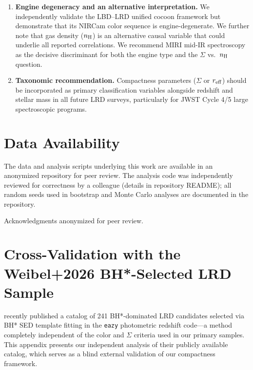 \documentclass[twocolumn,linenumbers]{aastex631}
\begin{document}
\begin{enumerate}
\item \textbf{Engine degeneracy and an alternative interpretation.} We independently validate the LBD--LRD unified cocoon framework \citep{Sneppen2026a} but demonstrate that its NIRCam color sequence is engine-degenerate. We further note that gas density ($n_{\rm H}$) is an alternative causal variable that could underlie all reported correlations. We recommend MIRI mid-IR spectroscopy as the decisive discriminant for both the engine type and the $\Sigma$ vs.\ $n_{\rm H}$ question.

\item \textbf{Taxonomic recommendation.} Compactness parameters ($\Sigma$ or $r_{\rm eff}$) should be incorporated as primary classification variables alongside redshift and stellar mass in all future LRD surveys, particularly for JWST Cycle 4/5 large spectroscopic programs.
\end{enumerate}

\section*{Data Availability}

The data and analysis scripts underlying this work are available in an anonymized repository for peer review. The analysis code was independently reviewed for correctness by a colleague (details in repository README); all random seeds used in bootstrap and Monte Carlo analyses are documented in the repository.

\begin{acknowledgments}
Acknowledgments anonymized for peer review.
\end{acknowledgments}




\appendix
\setcounter{equation}{0}
\renewcommand{\theequation}{\thesection\arabic{equation}}
\renewcommand{\theHequation}{\thesection\arabic{equation}}

\section{Cross-Validation with the Weibel+2026 BH*-Selected LRD Sample}
\label{app:weibel}

\citet{Weibel2026} recently published a catalog of 241 BH*-dominated LRD candidates selected via BH* SED template fitting in the \texttt{eazy} photometric redshift code---a method completely independent of the color and $\Sigma$ criteria used in our primary samples. This appendix presents our independent analysis of their publicly available catalog, which serves as a blind external validation of our compactness framework.
\end{document}
